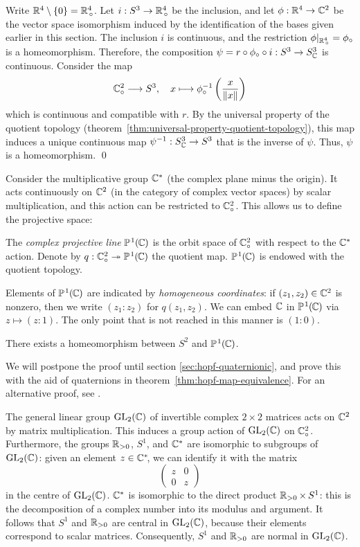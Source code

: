 \proof
\newcommand*{\RZ}{{\R^4_{\,\circ}}}
Write $\R^4 \setminus \set{0} = \RZ$.
Let $i : S^3 \to \RZ$ be the inclusion,
and let $\phi : \R^4 \to \C^2$ be the vector space isomorphism
induced by the identification of the bases given earlier in this section.
The inclusion $i$ is continuous, and the restriction $\phi|_\RZ = \phi_\circ$ is a homeomorphism.
Therefore, the composition $\psi = r \circ \phi_\circ \circ i : S^3 \to \SC$ is continuous.
Consider the map
\vspace{-0.3\parskip}
\[ \CZ \longto S^3,
\quad x \longmapsto \phi_\circ^{-1} \left( \frac{x}{\|x\|} \right) \vspace{0.3\parskip} \]
which is continuous and compatible with $r$.
By the universal property of the quotient topology (theorem~\ref{thm:universal-property-quotient-topology}),
this map induces a unique continuous map $\psi^{-1} : \SC \to S^3$ that is the inverse of $\psi$.
Thus, $\psi$ is a homeomorphism.
\qed

Consider the multiplicative group $\C^*$ (the complex plane minus the origin).
It acts continuously on $\C^2$ (in the category of complex vector spaces) by scalar multiplication,
and this action can be restricted to $\CZ$.
This allows us to define the projective space:

The \emph{complex projective line} $\PC$ is the orbit space of $\CZ$ with respect to the $\C^*$ action.
Denote by $q : \CZ \surj \PC$ the quotient map.
$\PC$ is endowed with the quotient topology.

Elements of $\PC$ are indicated by \emph{homogeneous coordinates}:
if $(z_1, z_2)  \in \C^2$ is nonzero,
then we write $(z_1 : z_2)$ for $q(z_1, z_2)$.
We can embed $\C$ in $\PC$ via $z \mapsto (z : 1)$.
The only point that is not reached in this manner is $(1 : 0)$.

There exists a homeomorphism between $S^2$ and $\PC$.

\proof
We will postpone the proof until section \ref{sec:hopf-quaternionic},
and prove this with the aid of quaternions in theorem~\ref{thm:hopf-map-equivalence}.
For an alternative proof, see \parencite[ch.~\textsc{viii}, \S~4.3]{bourbaki1974}.

The general linear group $\GLC$
of invertible complex $2 \times 2$ matrices
acts on $\C^2$ by matrix multiplication.
This induces a group action of $\GLC$ on $\CZ$.
Furthermore, the groups $\Rpos$, $S^1$, and $\C^*$ are isomorphic to subgroups of $\GLC$:
given an element $z \in \C^*\!$,
we can identify it with the matrix
\[ \begin{pmatrix} z & 0 \\ 0 & z \end{pmatrix} \]
in the centre of $\GLC$.
$\C^*$ is isomorphic to the direct product $\Rpos \times S^1$:
this is the decomposition of a complex number into its modulus and argument.
It follows that $S^1$ and $\Rpos$ are central in $\GLC$, because their elements correspond to scalar matrices.
Consequently, $S^1$ and $\Rpos$ are normal in $\GLC$.

